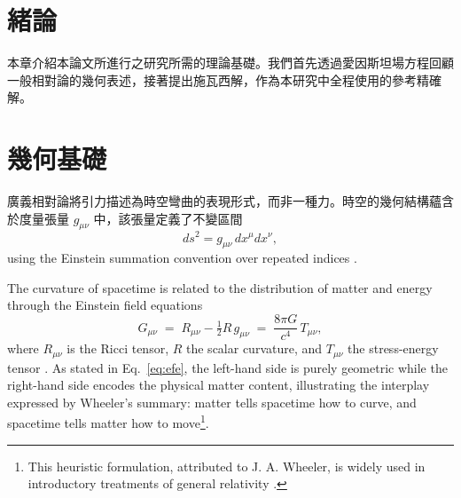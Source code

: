 \label{ch:chap1}

\section{緒論}
本章介紹本論文所進行之研究所需的理論基礎。我們首先透過愛因斯坦場方程回顧一般相對論的幾何表述，接著提出施瓦西解，作為本研究中全程使用的參考精確解\cite{einstein1916,wald1984}。

\section{幾何基礎}

廣義相對論將引力描述為時空彎曲的表現形式，而非一種力。時空的幾何結構蘊含於度量張量 $g_{\mu\nu}$ 中，該張量定義了不變區間
\begin{equation}
	ds^2 = g_{\mu\nu}\,dx^{\mu}dx^{\nu},
	\label{eq:metric}
\end{equation}
using the Einstein summation convention over repeated indices \cite{misner1973}.

The curvature of spacetime is related to the distribution of matter and energy through the Einstein field equations
\begin{equation}
	G_{\mu\nu} \;=\; R_{\mu\nu} - \tfrac{1}{2}R\,g_{\mu\nu} \;=\; \frac{8\pi G}{c^4}\,T_{\mu\nu},
	\label{eq:efe}
\end{equation}
where $R_{\mu\nu}$ is the Ricci tensor, $R$ the scalar curvature, and $T_{\mu\nu}$ the stress-energy tensor \cite{wald1984}. As stated in Eq.~\eqref{eq:efe}, the left-hand side is purely geometric while the right-hand side encodes the physical matter content, illustrating the interplay expressed by Wheeler's summary: matter tells spacetime how to curve, and spacetime tells matter how to move\footnote{This heuristic formulation, attributed to J. A. Wheeler, is widely used in introductory treatments of general relativity \cite{misner1973}.}.

